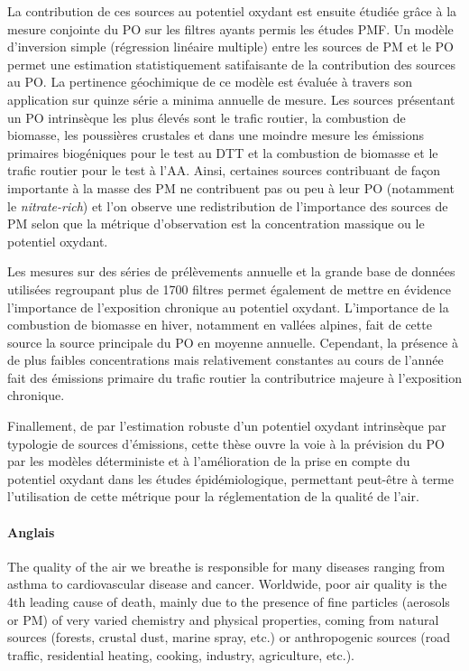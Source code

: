 La contribution de ces sources au potentiel oxydant est ensuite étudiée grâce à la mesure
conjointe du PO sur les filtres ayants permis les études PMF. Un modèle
d'inversion simple (régression linéaire multiple) entre les sources de PM et le PO permet
une estimation statistiquement satifaisante de la contribution des sources au PO. La
pertinence géochimique de ce modèle est évaluée à travers son application sur quinze série
a minima annuelle de mesure. Les sources présentant un PO intrinsèque les plus élevés sont le trafic routier, la combustion de biomasse, les
poussières crustales et dans une moindre mesure les émissions primaires biogéniques pour
le test au DTT et la combustion de biomasse et le trafic routier pour le test à l'AA.
Ainsi, certaines sources contribuant de façon importante à la masse des PM ne contribuent
pas ou peu à leur PO (notamment le \textit{nitrate-rich}) et l'on observe une redistribution de
l'importance des sources de PM selon que la métrique d'observation est la concentration
massique ou le potentiel oxydant.

Les mesures sur des séries de prélèvements annuelle et la grande base de données
utilisées regroupant plus de 1700 filtres permet également de mettre en évidence
l'importance de l'exposition chronique au potentiel oxydant. L'importance de la
combustion de biomasse en hiver, notamment en vallées alpines, fait de cette source la
source principale du PO en moyenne annuelle. Cependant, la présence à de plus faibles
concentrations mais relativement constantes au cours de l'année fait des émissions
primaire du trafic routier la contributrice majeure à l'exposition chronique.

Finallement, de par l'estimation robuste d'un potentiel oxydant intrinsèque par typologie
de sources d'émissions, cette thèse ouvre la voie à la prévision du PO par les modèles
déterministe et à l'amélioration de la prise en compte du potentiel oxydant dans les
études épidémiologique, permettant peut-être à terme l'utilisation de cette métrique pour
la réglementation de la qualité de l'air.

\paragraph{Anglais}%
\label{par:anglais}

The quality of the air we breathe is responsible for many diseases ranging from asthma to
cardiovascular disease and cancer. Worldwide, poor air quality is the 4th leading cause
of death, mainly due to the presence of fine particles (aerosols or
PM) of very varied chemistry and physical properties, coming from natural sources
(forests, crustal dust, marine spray, etc.) or anthropogenic sources (road traffic,
residential heating, cooking, industry, agriculture, etc.).

